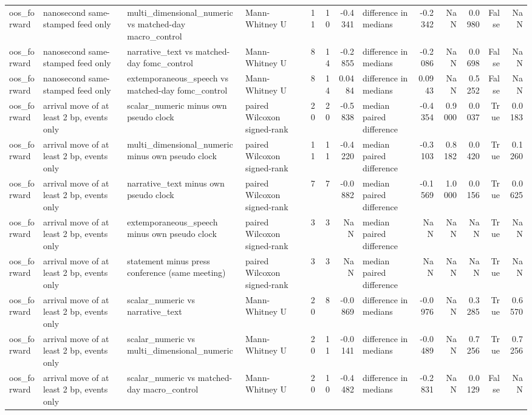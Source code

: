 \begin{tabular}{llllrrrlrrrrr}
oos_forward & nanosecond same-stamped feed only & multi_dimensional_numeric vs matched-day macro_control & Mann-Whitney U & 11 & 10 & -0.4341 & difference in medians & -0.2342 & NaN & 0.0980 & False & NaN \\
oos_forward & nanosecond same-stamped feed only & narrative_text vs matched-day fomc_control & Mann-Whitney U & 8 & 14 & -0.2855 & difference in medians & -0.2086 & NaN & 0.0698 & False & NaN \\
oos_forward & nanosecond same-stamped feed only & extemporaneous_speech vs matched-day fomc_control & Mann-Whitney U & 8 & 14 & 0.0484 & difference in medians & 0.0943 & NaN & 0.5252 & False & NaN \\
oos_forward & arrival move of at least 2 bp, events only & scalar_numeric minus own pseudo clock & paired Wilcoxon signed-rank & 20 & 20 & -0.5838 & median paired difference & -0.4354 & 0.9000 & 0.0037 & True & 0.0183 \\
oos_forward & arrival move of at least 2 bp, events only & multi_dimensional_numeric minus own pseudo clock & paired Wilcoxon signed-rank & 11 & 11 & -0.4220 & median paired difference & -0.3103 & 0.8182 & 0.0420 & True & 0.1260 \\
oos_forward & arrival move of at least 2 bp, events only & narrative_text minus own pseudo clock & paired Wilcoxon signed-rank & 7 & 7 & -0.0882 & median paired difference & -0.1569 & 1.0000 & 0.0156 & True & 0.0625 \\
oos_forward & arrival move of at least 2 bp, events only & extemporaneous_speech minus own pseudo clock & paired Wilcoxon signed-rank & 3 & 3 & NaN & median paired difference & NaN & NaN & NaN & True & NaN \\
oos_forward & arrival move of at least 2 bp, events only & statement minus press conference (same meeting) & paired Wilcoxon signed-rank & 3 & 3 & NaN & median paired difference & NaN & NaN & NaN & True & NaN \\
oos_forward & arrival move of at least 2 bp, events only & scalar_numeric vs narrative_text & Mann-Whitney U & 20 & 8 & -0.0869 & difference in medians & -0.0976 & NaN & 0.3285 & True & 0.6570 \\
oos_forward & arrival move of at least 2 bp, events only & scalar_numeric vs multi_dimensional_numeric & Mann-Whitney U & 20 & 11 & -0.0141 & difference in medians & -0.0489 & NaN & 0.7256 & True & 0.7256 \\
oos_forward & arrival move of at least 2 bp, events only & scalar_numeric vs matched-day macro_control & Mann-Whitney U & 20 & 10 & -0.4482 & difference in medians & -0.2831 & NaN & 0.0129 & False & NaN \\

\end{tabular}
